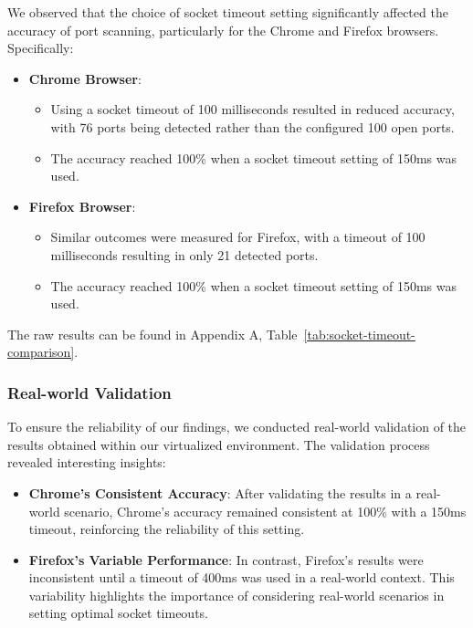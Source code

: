 We observed that the choice of socket timeout setting significantly affected the accuracy of port scanning, particularly for the Chrome and Firefox browsers. Specifically:

\begin{itemize}
    \item \textbf{Chrome Browser}:
    \begin{itemize}
        \item Using a socket timeout of 100 milliseconds resulted in reduced accuracy, with 76 ports being detected rather than the configured 100 open ports.
        \item The accuracy reached 100\% when a socket timeout setting of 150ms was used.
    \end{itemize}
    
    \item \textbf{Firefox Browser}:
    \begin{itemize}
        \item Similar outcomes were measured for Firefox, with a timeout of 100 milliseconds resulting in only 21 detected ports.
        \item The accuracy reached 100\% when a socket timeout setting of 150ms was used.
    \end{itemize}
\end{itemize}

The raw results can be found in Appendix A, Table~\ref{tab:socket-timeout-comparison}.

\subsubsection{Real-world Validation}

To ensure the reliability of our findings, we conducted real-world validation of the results obtained within our virtualized environment. The validation process revealed interesting insights:

\begin{itemize}
    \item \textbf{Chrome's Consistent Accuracy}: After validating the results in a real-world scenario, Chrome's accuracy remained consistent at 100\% with a 150ms timeout, reinforcing the reliability of this setting.
    
    \item \textbf{Firefox's Variable Performance}: In contrast, Firefox's results were inconsistent until a timeout of 400ms was used in a real-world context. This variability highlights the importance of considering real-world scenarios in setting optimal socket timeouts.
\end{itemize}



